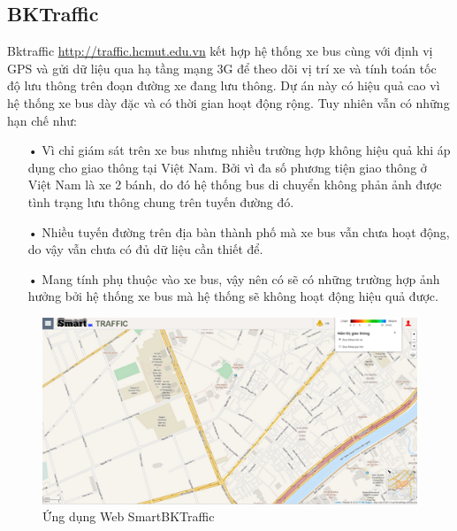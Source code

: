 \subsection{BKTraffic}
Bktraffic \url{http://traffic.hcmut.edu.vn} kết hợp hệ thống xe bus cùng với định vị GPS và gửi dữ liệu qua hạ tầng mạng 3G để theo dõi vị trí xe và tính toán tốc độ lưu thông trên đoạn đường xe đang lưu thông. Dự án này có hiệu quả cao vì hệ thống xe bus dày đặc và có thời gian hoạt động rộng. Tuy nhiên vẫn có những hạn chế như:
\begin{itemize}
\item[•]Vì chỉ giám sát trên xe bus nhưng nhiều trường hợp không hiệu quả khi áp dụng cho giao thông tại Việt Nam. Bởi vì đa số phương tiện giao thông ở Việt Nam là xe 2 bánh, do đó hệ thống bus di chuyển không phản ảnh được tình trạng lưu thông chung trên tuyến đường đó.
\item[•]Nhiều tuyến đường trên địa bàn thành phố mà xe bus vẫn chưa hoạt động, do vậy vẫn chưa có đủ dữ liệu cần thiết để.
\item[•]Mang tính phụ thuộc vào xe bus, vậy nên có sẽ có những trường hợp ảnh hưởng bởi hệ thống xe bus mà hệ thống sẽ không hoạt động hiệu quả được.
\end{itemize}

\begin{figure}[H] 
\centering    
\includegraphics[width=1.0\textwidth]{pic2}
\caption[Ứng dụng Web SmartBKTraffic ]{ Ứng dụng Web SmartBKTraffic}
\label{fig:pic2}
\end{figure}

